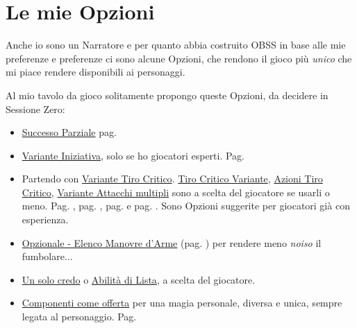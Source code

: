 \section{Le mie Opzioni}

\normalsize

Anche io sono un Narratore e per quanto abbia costruito OBSS in base alle mie preferenze e preferenze ci sono alcune Opzioni, che rendono il gioco più \emph{unico} che mi piace rendere disponibili ai personaggi.

Al mio tavolo da gioco solitamente propongo queste Opzioni, da decidere in Sessione Zero:

\begin{itemize}[leftmargin=*] \setlength{\itemsep}{0pt}

\item
\hyperlink{successoparziale}{Successo Parziale} pag. \pageref{successoparziale}

\item
\hyperlink{varianteiniziativa}{Variante Iniziativa}, solo se ho giocatori esperti. Pag. \pageref{varianteiniziativa}

\item
Partendo con \hyperlink{variantetiricritici}{Variante Tiro Critico}. \hyperlink{tirocriticovariante}{Tiro Critico Variante}, \hyperlink{OpzionaleAzioniTiroCritico}{Azioni Tiro Critico},  \hyperlink{varianteattacchimultipli}{Variante Attacchi multipli} sono a scelta del giocatore se usarli o meno. Pag. \pageref{tirocriticovariante}, pag. \pageref{OpzionaleAzioniTiroCritico}, pag. \pageref{variantetiricritici} e pag. \pageref{varianteattacchimultipli}. Sono Opzioni suggerite per giocatori già con esperienza.

\item \hyperlink{elencotalentiarmi}{Opzionale - Elenco Manovre d'Arme} (pag. \pageref{elencotalentiarmi}) per rendere meno \emph{noiso} il fumbolare...


\item 
\hyperlink{Un solo credo}{Un solo credo} o \hyperlink{abilitadilista}{Abilità di Lista}, a scelta del giocatore.

\item
\hyperlink{componenticomeofferta}{Componenti come offerta} per una magia personale, diversa e unica, sempre legata al personaggio. Pag. \pageref{componenticomeofferta}


\end{itemize}
